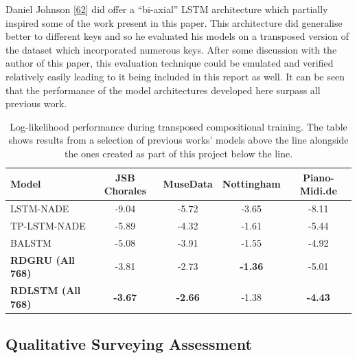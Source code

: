 \documentclass[12pt,]{article}
\begin{document}
Daniel Johnson {[}\protect\hyperlink{ref-johnson2017generating}{62}{]}
did offer a ``bi-axial'' LSTM architecture which partially inspired some
of the work present in this paper. This architecture did generalise
better to different keys and so he evaluated his models on a transposed
version of the dataset which incorporated numerous keys. After some
discussion with the author of this paper, this evaluation technique
could be emulated and verified relatively easily leading to it being
included in this report as well. It can be seen that the performance of
the model architectures developed here surpass all previous work.

\begin{table}[H]
\centering
\caption{Log-likelihood performance during transposed compositional training. The table shows results from a selection of previous works’ models above the line alongside the ones created as part of this project below the line.}
\vspace{1em}
\begin{tabular}{lcccc} 
\toprule
\textbf{Model}    & \textbf{JSB Chorales} & \textbf{MuseData} & \textbf{Nottingham} & \textbf{Piano-Midi.de}  \\ 
\midrule
LSTM-NADE         & -9.04                 & -5.72             & -3.65               & -8.11                   \\
TP-LSTM-NADE      & -5.89                 & -4.32             & -1.61               & -5.44                   \\
BALSTM            & -5.08                 & -3.91             & -1.55               & -4.92                   \\
\midrule
\textbf{RDGRU (All 768)}  & -3.81                 & -2.73             & \textbf{-1.36}      & -5.01                   \\
\textbf{RDLSTM (All 768)} & \textbf{-3.67}        & \textbf{-2.66}    & -1.38               & \textbf{-4.43}          \\
\bottomrule
\end{tabular}
\end{table}

\hypertarget{qualitative-surveying-assessment}{%
\subsection{Qualitative Surveying
Assessment}\label{qualitative-surveying-assessment}}
\end{document}
